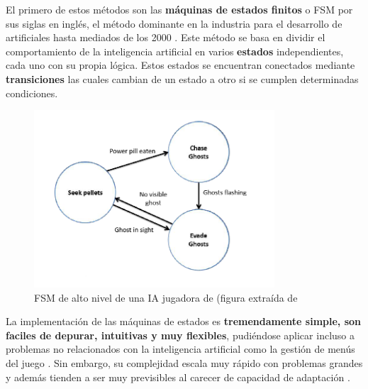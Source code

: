 El primero de estos métodos son las \textbf{máquinas de estados finitos} o FSM por sus siglas en inglés, el método dominante en la industria para el desarrollo de  artificiales hasta mediados de los 2000 \cite{ai_and_games}. Este método se basa en dividir el comportamiento de la inteligencia artificial en varios \textbf{estados} independientes, cada uno con su propia lógica. Estos estados se encuentran conectados mediante \textbf{transiciones} las cuales cambian de un estado a otro si se cumplen determinadas condiciones.

\begin{figure}[h]
	\includegraphics[width=0.8\textwidth]{images/estadodelarte/ai/pacman-fsm}
	\centering
	\caption{FSM de alto nivel de una IA jugadora de  (figura extraída de \cite{ai_and_games}}
	\label{pacman}
\end{figure}

La implementación de las máquinas de estados es \textbf{tremendamente simple, son faciles de depurar, intuitivas y muy flexibles}, pudiéndose aplicar incluso a problemas no relacionados con la inteligencia artificial como la gestión de menús del juego \cite{libro_esi}. Sin embargo, su complejidad escala muy rápido con problemas grandes y además tienden a ser muy previsibles al carecer de capacidad de adaptación \cite{ai_and_games}.

